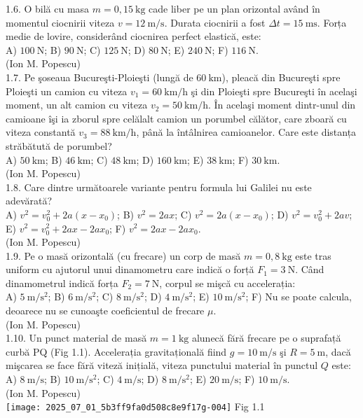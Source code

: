 1.6. O bilă cu masa $m=0,15 \mathrm{~kg}$ cade liber pe un plan orizontal având în momentul ciocnirii viteza $v=12 \mathrm{~m} / \mathrm{s}$. Durata ciocnirii a fost $\Delta t=15 \mathrm{~ms}$. Forța medie de lovire, considerând ciocnirea perfect elastică, este:\\ A) $100 \mathrm{~N}$; B) $90 \mathrm{~N}$; C) $125 \mathrm{~N}$; D) $80 \mathrm{~N}$; E) $240 \mathrm{~N}$; F) $116 \mathrm{~N}$.\\ (Ion M. Popescu)\\

1.7. Pe şoseaua Bucureşti-Ploieşti (lungă de $60 \mathrm{~km}$), pleacă din Bucureşti spre Ploieşti un camion cu viteza $v_{1}=60 \mathrm{~km} / \mathrm{h}$ şi din Ploieşti spre Bucureşti în acelaşi moment, un alt camion cu viteza $v_{2}=50 \mathrm{~km} / \mathrm{h}$. În acelaşi moment dintr-unul din camioane îşi ia zborul spre celălalt camion un porumbel călător, care zboară cu viteza constantă $v_{3}=88 \mathrm{~km} / \mathrm{h}$, până la întâlnirea camioanelor. Care este distanța străbătută de porumbel?\\ A) $50 \mathrm{~km}$; B) $46 \mathrm{~km}$; C) $48 \mathrm{~km}$; D) $160 \mathrm{~km}$; E) $38 \mathrm{~km}$; F) $30 \mathrm{~km}$.\\ (Ion M. Popescu)\\

1.8. Care dintre următoarele variante pentru formula lui Galilei nu este adevărată?\\ A) $v^{2}=v_{0}^{2}+2 a\left(x-x_{0}\right)$; B) $v^{2}=2 a x$; C) $v^{2}=2 a\left(x-x_{0}\right)$; D) $v^{2}=v_{0}^{2}+2 a v$; E) $v^{2}=v_{0}^{2}+2 a x-2 a x_{0}$; F) $v^{2}=2 a x-2 a x_{0}$.\\ (Ion M. Popescu)\\

1.9. Pe o masă orizontală (cu frecare) un corp de masă $m=0,8 \mathrm{~kg}$ este tras uniform cu ajutorul unui dinamometru care indică o forță $F_{1}=3 \mathrm{~N}$. Când dinamometrul indică forța $F_{2}=7 \mathrm{~N}$, corpul se mişcă cu accelerația:\\ A) $5 \mathrm{~m} / \mathrm{s}^{2}$; B) $6 \mathrm{~m} / \mathrm{s}^{2}$; C) $8 \mathrm{~m} / \mathrm{s}^{2}$; D) $4 \mathrm{~m} / \mathrm{s}^{2}$; E) $10 \mathrm{~m} / \mathrm{s}^{2}$; F) Nu se poate calcula, deoarece nu se cunoaşte coeficientul de frecare $\mu$.\\ (Ion M. Popescu)\\

1.10. Un punct material de masă $m=1 \mathrm{~kg}$ alunecă fără frecare pe o suprafață curbă PQ (Fig 1.1). Accelerația gravitațională fiind $g=10 \mathrm{~m} / \mathrm{s}$ şi $R=5 \mathrm{~m}$, dacă mişcarea se face fără viteză inițială, viteza punctului material în punctul $Q$ este:\\ A) $8 \mathrm{~m} / \mathrm{s}$; B) $10 \mathrm{~m} / \mathrm{s}^{2}$; C) $4 \mathrm{~m} / \mathrm{s}$; D) $8 \mathrm{~m} / \mathrm{s}^{2}$; E) $20 \mathrm{~m} / \mathrm{s}$; F) $10 \mathrm{~m} / \mathrm{s}$.\\ (Ion M. Popescu)\\ \texttt{[image: 2025\_07\_01\_5b3ff9fa0d508c8e9f17g-004]} Fig 1.1\\

